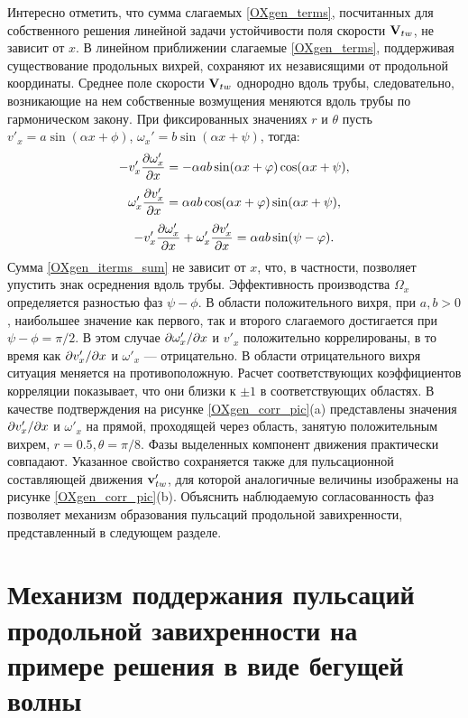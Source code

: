 Интересно отметить, что сумма слагаемых \eqref{OXgen_terms}, посчитанных для собственного решения линейной задачи устойчивости поля скорости $\mathbf{V}_{tw}$, не зависит от $x$. В линейном приближении слагаемые \eqref{OXgen_terms}, поддерживая существование продольных вихрей, сохраняют их независящими от продольной координаты. Среднее поле скорости $\mathbf{V}_{tw}$ однородно вдоль трубы, следовательно, возникающие на нем собственные возмущения меняются вдоль трубы по гармоническом закону. При фиксированных значениях $r$ и $\theta$ пусть  $v'_x = a \sin(\alpha x + \phi)$, $\omega_x' = b \sin(\alpha x + \psi)$, тогда:
\begin{equation*} \label{OXgen_iterms_1}
 - v'_x \frac{\partial \omega'_x}{\partial x} = - \alpha a b \sin(\alpha x + \varphi) \cos(\alpha x + \psi),
\end{equation*}
\begin{equation*} \label{OXgen_iterms_2}
\omega'_x \frac{\partial v'_x}{\partial x} =  \alpha a b \cos(\alpha x + \varphi) \sin(\alpha x + \psi),
\end{equation*}
\begin{equation} \label{OXgen_iterms_sum}
 - v'_x \frac{\partial \omega'_x}{\partial x} + \omega'_x \frac{\partial v'_x}{\partial x} = \alpha a b \sin(\psi - \varphi).
\end{equation}
Сумма \eqref{OXgen_iterms_sum} не зависит от $x$, что, в частности, позволяет упустить знак осреднения вдоль трубы. Эффективность производства  $\Omega_x$ определяется разностью фаз $\psi - \phi$. В области положительного вихря, при $a,b > 0$, наибольшее значение как первого, так и второго слагаемого достигается при $\psi - \phi = \pi/2$. В этом случае $\partial \omega'_x/\partial x$ и $v'_x$ положительно коррелированы, в то время как $\partial v'_x/\partial x$ и $\omega'_x$ --- отрицательно. В области отрицательного вихря ситуация меняется на противоположную. Расчет соответствующих коэффициентов корреляции показывает, что они близки к $\pm1$ в соответствующих областях. В качестве подтверждения на рисунке \ref{OXgen_corr_pic}(a) представлены значения $\partial v'_x/\partial x$ и $\omega'_x$ на прямой, проходящей через область, занятую положительным вихрем, $r = 0.5, \theta = \pi/8$. Фазы выделенных компонент движения практически совпадают. Указанное свойство сохраняется также для пульсационной составляющей движения $\mathbf{v}'_{tw}$, для которой аналогичные величины изображены на рисунке \ref{OXgen_corr_pic}(b). Объяснить наблюдаемую согласованность фаз позволяет механизм образования пульсаций продольной завихренности, представленный в следующем разделе. 


\section{Механизм поддержания пульсаций продольной завихренности на примере решения в виде бегущей волны}

